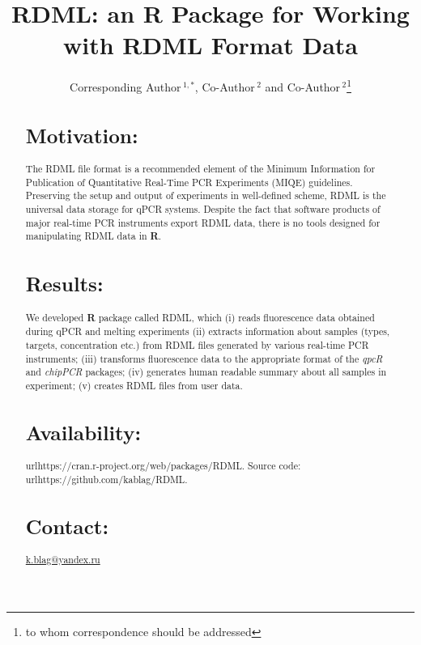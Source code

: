 \documentclass{bioinfo}
\begin{document}
	
	\title[RDML]{RDML: an \textbf{R} Package for Working with RDML Format Data}
	\author[Sample \textit{et~al}]{Corresponding Author\,$^{1,*}$, Co-Author\,$^{2}$
		and Co-Author\,$^2$\footnote{to whom correspondence should be addressed}}
	\address{$^{1}$Department of XXXXXXX, Address XXXX etc.\\ $^{2}$Department of
		XXXXXXXX, Address XXXX etc.}
	
	
	
	\maketitle
	
	\begin{abstract}
		
		\section{Motivation:} The RDML file format is a recommended element of the
		Minimum Information for Publication of Quantitative Real-Time PCR Experiments
		(MIQE) guidelines. Preserving the setup and output of experiments in
		well-defined scheme, RDML is the universal data storage for qPCR systems.
		Despite the fact that software products of major real-time PCR instruments export 
		RDML data, there is no tools designed for manipulating RDML data in \textbf{R}.
		
		\section{Results:} We developed \textbf{R} package called RDML, which (i) reads
		fluorescence data obtained during qPCR and melting experiments (ii) extracts
		information about samples (types, targets, concentration etc.) from RDML files
		generated by various real-time PCR instruments; (iii) transforms fluorescence
		data to the appropriate format of the \textit{qpcR} and \textit{chipPCR}
		packages; (iv) generates human readable summary about all samples in experiment;
		(v) creates RDML files from user data. \section{Availability:}
		url{https://cran.r-project.org/web/packages/RDML}. Source code:
		url{https://github.com/kablag/RDML}. \section{Contact:}
		\href{k.blag@yandex.ru}{k.blag@yandex.ru} \end{abstract}
	
\end{document}
